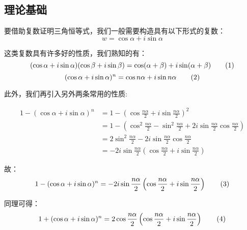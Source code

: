 
\begin{issues}
\issueTODO
{}
\end{issues}


\subsection{理论基础}
要借助复数证明三角恒等式，我们一般需要构造具有以下形式的复数：
$$w=\cos \alpha+i\sin\alpha$$

这类复数具有许多好的性质，我们熟知的有：
$$(\cos\alpha+i\sin\alpha)(\cos\beta+i\sin\beta)=\cos(\alpha+\beta)+i\sin(\alpha+\beta)\\\tag{1} $$
$$
(\cos\alpha+i\sin\alpha)^n=\cos n\alpha+i\sin n\alpha\\\tag{2}$$

此外，我们再引入另外两条常用的性质:

$$\begin{aligned}
 1-(\cos\alpha+i\sin\alpha)^n&=1-\left(\cos{\frac{n\alpha}2+i\sin{\frac{n\alpha}2}}\right)^{2}\\ &=1-\left(\cos^2{\frac{n\alpha}2}-\sin^2{\frac{n\alpha}2}+2i\sin{\frac{n\alpha}2}\cos{\frac{n\alpha}2}\right)\\ &=2\sin^2{\frac{n\alpha}2}-2i\sin{\frac{n\alpha}2}\cos{\frac{n\alpha}2}\\ &=-2i\sin{\frac{n\alpha}2}\left(\cos{\frac{n\alpha}2}+i\sin{\frac{n\alpha}2}\right) 
\end{aligned}$$

故：
$$1-(\cos\alpha+i\sin\alpha)^n=-2i\sin{\frac{n\alpha}2}\left(\cos{\frac{n\alpha}2}+i\sin{\frac{n\alpha}2}\right)\\\tag{3}$$

同理可得：
$$
1+(\cos\alpha+i\sin\alpha)^n=2\cos{\frac{n\alpha}2}\left(\cos{\frac{n\alpha}2}+i\sin{\frac{n\alpha}2}\right)\\\tag{4}$$

